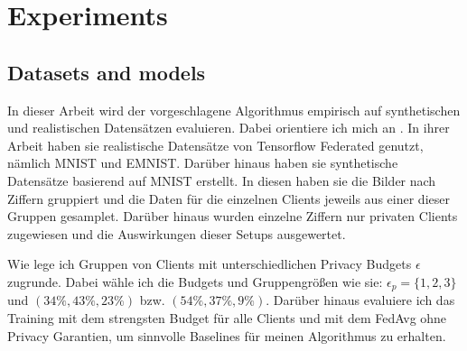 \chapter{Experiments}

\section{Datasets and models}

In dieser Arbeit wird der vorgeschlagene Algorithmus empirisch auf synthetischen und realistischen Datensätzen evaluieren. Dabei orientiere ich mich an \textcite{aldaghri:2023}. In ihrer Arbeit haben sie realistische Datensätze von Tensorflow Federated genutzt, nämlich MNIST und EMNIST. Darüber hinaus haben sie synthetische Datensätze basierend auf MNIST erstellt. In diesen haben sie die Bilder nach Ziffern gruppiert und die Daten für die einzelnen Clients jeweils aus einer dieser Gruppen gesamplet. Darüber hinaus wurden einzelne Ziffern nur privaten Clients zugewiesen und die Auswirkungen dieser Setups ausgewertet.

Wie \textcite{boenisch:2023} lege ich Gruppen von Clients mit unterschiedlichen Privacy Budgets $\epsilon$ zugrunde. Dabei wähle ich die Budgets und Gruppengrößen wie sie: $\epsilon_p = \{1,2,3\}$ und $(34\%, 43\%, 23\%)$ bzw. $(54\%, 37\%, 9\%)$. Darüber hinaus evaluiere ich das Training mit dem strengsten Budget für alle Clients und mit dem FedAvg ohne Privacy Garantien, um sinnvolle Baselines für meinen Algorithmus zu erhalten.
